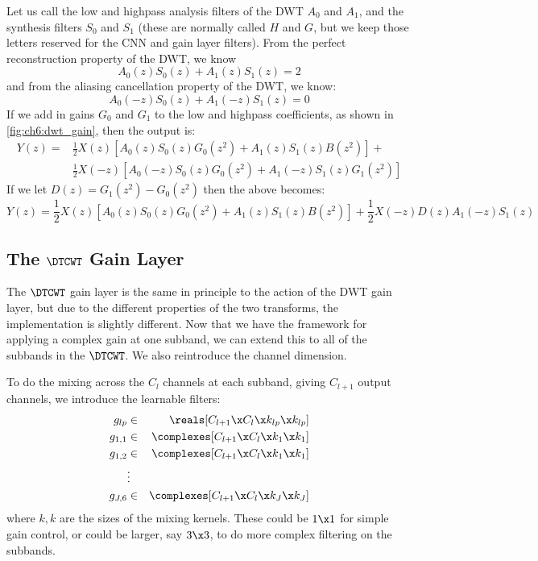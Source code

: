 Let us call the low and highpass analysis filters of the DWT $A_0$ and $A_1$,
and the synthesis filters $S_0$ and $S_1$ (these are normally called $H$ and
$G$, but we keep those letters reserved for the CNN and gain layer filters). 
From the perfect reconstruction property of the DWT, we know 
\begin{equation}
  A_0(z)S_0(z) + A_1(z)S_1(z) = 2
\end{equation}
and from the aliasing cancellation property of the DWT, we know:
\begin{equation}
  A_0(-z)S_0(z) + A_1(-z)S_1(z) = 0
\end{equation}
%
If we add in gains $G_0$ and $G_1$ to the low and highpass coefficients, as
shown in \autoref{fig:ch6:dwt_gain}, then the output is:
\begin{equation}
  \begin{split}
   Y(z) =& \frac{1}{2} X(z) \left[A_0(z)S_0(z)G_0(z^2) + A_1(z)S_1(z)B(z^2) \right] + \\
         & \frac{1}{2}X(-z) \left[A_0(-z)S_0(z)G_0(z^2) + A_1(-z)S_1(z)G_1(z^2) \right]
\end{split}
\end{equation}
If we let $D(z) = G_1(z^2) - G_0(z^2)$ then the above becomes:
\begin{equation}
   Y(z) = \frac{1}{2} X(z) \left[A_0(z)S_0(z)G_0(z^2) + A_1(z)S_1(z)B(z^2) \right] + \frac{1}{2}X(-z)D(z)A_1(-z)S_1(z)
\end{equation}
 
\subsection{The $\DTCWT$ Gain Layer}

The $\DTCWT$ gain layer is the same in principle to the action of the DWT gain
layer, but due to the different properties of the two transforms, the
implementation is slightly different. 
Now that we have the framework for applying a complex gain at one subband, we
can extend this to all of the subbands in the $\DTCWT$. We also reintroduce the channel
dimension. 

To do the mixing across the $C_l$ channels at each subband, giving $C_{l+1}$
output channels, we introduce the learnable filters:
%
\begin{eqnarray}
  g_{lp} &\in& \reals[C_{l+1}\x C_l\x k_{lp}\x k_{lp}] \label{eq:ch6:glp} \\
  g_{1,1} &\in& \complexes[C_{l+1}\x C_l\x k_1\x k_1] \\
  g_{1,2} &\in& \complexes[C_{l+1}\x C_l\x k_1\x k_1] \\
      & \vdots &\\
  g_{J,6} &\in& \complexes[C_{l+1}\x C_l\x k_J\x k_J]  \label{eq:ch6:gj6}
\end{eqnarray}
%
where $k, k$ are the sizes of the mixing kernels. These could be $1\x 1$ for
simple gain control, or could be larger, say $3\x 3$, to do more complex
filtering on the subbands. 

